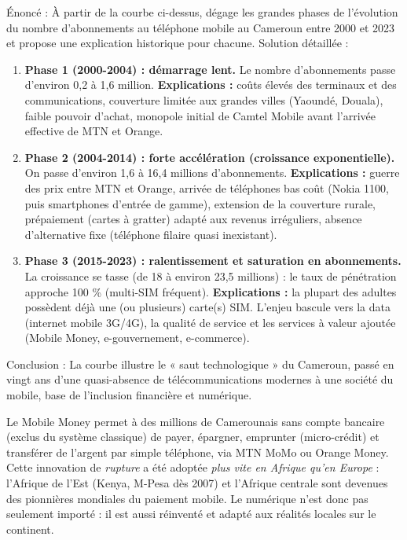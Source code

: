 \documentclass[11pt]{article}
\newcommand{\cle}[1]{{\popxbold\color{popdark}#1}}
\begin{document}
\begin{exoresolu}
Énoncé : À partir de la courbe ci-dessus, dégage les grandes phases de l'évolution du nombre d'abonnements au téléphone mobile au Cameroun entre 2000 et 2023 et propose une explication historique pour chacune.
\tcblower
Solution détaillée :
\begin{enumerate}
\item \textbf{Phase 1 (2000-2004) : démarrage lent.} Le nombre d'abonnements passe d'environ 0,2 à 1,6 million. \textbf{Explications :} coûts élevés des terminaux et des communications, couverture limitée aux grandes villes (Yaoundé, Douala), faible pouvoir d'achat, monopole initial de Camtel Mobile avant l'arrivée effective de MTN et Orange.
\item \textbf{Phase 2 (2004-2014) : forte accélération (croissance exponentielle).} On passe d'environ 1,6 à 16,4 millions d'abonnements. \textbf{Explications :} guerre des prix entre MTN et Orange, arrivée de téléphones bas coût (Nokia 1100, puis smartphones d'entrée de gamme), extension de la couverture rurale, prépaiement (cartes à gratter) adapté aux revenus irréguliers, absence d'alternative fixe (téléphone filaire quasi inexistant).
\item \textbf{Phase 3 (2015-2023) : ralentissement et saturation en abonnements.} La croissance se tasse (de 18 à environ 23,5 millions) : le taux de pénétration approche 100 \% (multi-SIM fréquent). \textbf{Explications :} la plupart des adultes possèdent déjà une (ou plusieurs) carte(s) SIM. L'enjeu bascule vers la data (internet mobile 3G/4G), la qualité de service et les services à valeur ajoutée (Mobile Money, e-gouvernement, e-commerce).
\end{enumerate}
Conclusion : La courbe illustre le « saut technologique » du Cameroun, passé en vingt ans d'une quasi-absence de télécommunications modernes à une société du mobile, base de l'inclusion financière et numérique.
\end{exoresolu}

\begin{savaistu}
Le \cle{Mobile Money} permet à des millions de Camerounais sans compte bancaire (exclus du système classique) de payer, épargner, emprunter (micro-crédit) et transférer de l'argent par simple téléphone, via MTN MoMo ou Orange Money. Cette innovation de \emph{rupture} a été adoptée \emph{plus vite en Afrique qu'en Europe} : l'Afrique de l'Est (Kenya, M-Pesa dès 2007) et l'Afrique centrale sont devenues des pionnières mondiales du paiement mobile. Le numérique n'est donc pas seulement importé : il est aussi réinventé et adapté aux réalités locales sur le continent.
\end{savaistu}
\end{document}
